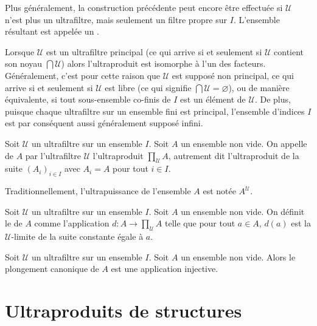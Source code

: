 \begin{remark}
	Plus généralement, la construction précédente peut encore être effectuée si $\mathcal{U}$ n'est plus un ultrafiltre, mais seulement un filtre propre sur $I$. L'ensemble résultant est appelée un . 
\end{remark}

Lorsque $\mathcal{U}$ est un ultrafiltre principal (ce qui arrive si et seulement si $\mathcal{U}$ contient son noyau $\bigcap\mathcal{U}$) alors l'ultraproduit est isomorphe à l'un des facteurs. Généralement, c'est pour cette raison que $\mathcal{U}$ est supposé non principal, ce qui arrive si et seulement si $\mathcal{U}$ est libre (ce qui signifie $\bigcap\mathcal{U}=\varnothing$), ou de manière équivalente, si tout sous-ensemble co-finis de $I$ est un élément de $\mathcal{U}$. De plus, puisque chaque ultrafiltre sur un ensemble fini est principal, l'ensemble d'indices $I$ est par conséquent aussi généralement supposé infini.

\begin{definition}
	Soit $\mathcal{U}$ un ultrafiltre sur un ensemble $I$. Soit $A$ un ensemble non vide. On appelle  de $A$ par l'ultrafiltre $\mathcal{U}$ l'ultraproduit $\prod_{\mathcal{U}}A$, autrement dit l'ultraproduit de la suite $\left(A_{i}\right)_{i\in I}$ avec $A_{i}=A$ pour tout $i\in I$.
\end{definition}

Traditionnellement, l'ultrapuissance de l'ensemble $A$ est notée $A^{\mathcal{U}}$.

\begin{definition}
	Soit $\mathcal{U}$ un ultrafiltre sur un ensemble $I$. Soit $A$ un ensemble non vide. On définit le  de $A$ comme l'application $d\colon A\to\prod_{\mathcal{U}}A$ telle que pour tout $a\in A$, $d(a)$ est la $\mathcal{U}$-limite de la suite constante égale à $a$.
\end{definition}

\begin{proposition}
	Soit $\mathcal{U}$ un ultrafiltre sur un ensemble $I$. Soit $A$ un ensemble non vide. Alors le plongement canonique de $A$ est une application injective.
\end{proposition}



\section{Ultraproduits de structures}

